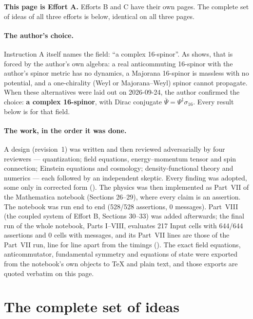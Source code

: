 \noindent\textbf{This page is Effort A.} Efforts B and C have their own pages. The complete set of
ideas of all three efforts is  below, identical on all three pages.

\paragraph{The author's choice.} Instruction A itself names the field: ``a complex 16-spinor''.
As  shows, that is forced by the author's own algebra: a real anticommuting
16-spinor with the author's spinor metric has no dynamics, a Majorana 16-spinor is massless with no
potential, and a one-chirality (Weyl or Majorana--Weyl) spinor cannot propagate. When these
alternatives were laid out on 2026-09-24, the author confirmed the choice: \textbf{a complex
16-spinor}, with Dirac conjugate $\bar\Psi=\Psi^{\ddagger}\sigma_{16}$. Every result below is for
that field.

\paragraph{The work, in the order it was done.} A design (revision~1) was written and then reviewed
adversarially by four reviewers --- quantization; field equations, energy--momentum tensor and spin
connection; Einstein equations and cosmology; density-functional theory and numerics --- each
followed by an independent skeptic. Every finding was adopted, some only in corrected form
(). The physics was then implemented as Part~VII of the Mathematica notebook
(Sections 26--29), where every claim is an assertion. The notebook was run end to end (528/528
assertions, 0 messages). Part~VIII (the coupled system of Effort B, Sections 30--33) was added
afterwards; the final run of the whole notebook, Parts I--VIII, evaluates 217 Input cells with 644/644
assertions and 0 cells with messages, and its Part~VII lines are those of the Part~VII run, line for
line apart from the timings (). The exact field equations, anticommutator, fundamental symmetry and
equations of state were exported from the notebook's own objects to TeX and plain text, and those
exports are quoted verbatim on this page.

\section{The complete set of ideas}
\label{sec:1}

